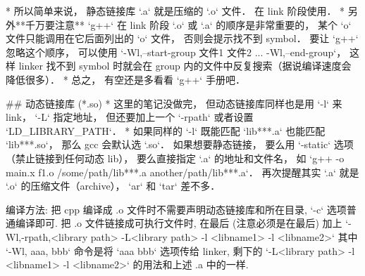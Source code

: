 * 所以简单来说， 静态链接库 `.a` 就是压缩的 `.o` 文件． 在 link 阶段使用．
* 另外**千万要注意** `g++` 在 link 阶段 `.o` 或 `.a` 的顺序是非常重要的， 某个 `o` 文件只能调用在它后面列出的 `o` 文件， 否则会提示找不到 symbol． 要让 `g++` 忽略这个顺序， 可以使用
`-Wl,--start-group 文件1 文件2 ... -Wl,--end-group`， 这样 linker 找不到 symbol 时就会在 group 内的文件中反复搜索（据说编译速度会降低很多）．
* 总之， 有空还是多看看 `g++` 手册吧．

## 动态链接库 (*.so)
* 这里的笔记没做完， 但动态链接库同样也是用 `-l` 来 link， `-L` 指定地址， 但还要加上一个 `-rpath` 或者设置 `LD_LIBRARY_PATH`．
* 如果同样的 `-l` 既能匹配 `lib***.a` 也能匹配 `lib***.so`， 那么 gcc 会默认选 `.so`． 如果想要静态链接， 要么用 `-static` 选项（禁止链接到任何动态 lib）， 要么直接指定 `.a` 的地址和文件名， 如 `g++ -o main.x f1.o /some/path/lib***.a another/path/lib***.a`． 再次提醒其实 `.a` 就是 `.o` 的压缩文件（archive）， `ar` 和 `tar` 差不多．

编译方法:
把 cpp 编译成 .o 文件时不需要声明动态链接库和所在目录, `-c` 选项普通编译即可.
把 .o 文件链接成可执行文件时, 在最后 (注意必须是在最后) 加上
`-Wl,-rpath,<library path>  -L<library path> -l <libname1> -l <libname2>`
其中 `-Wl, aaa, bbb` 命令是将 `aaa bbb` 选项传给 linker, 剩下的 `-L<library path> -l <libname1> -l <libname2>` 的用法和上述 .a 中的一样.
